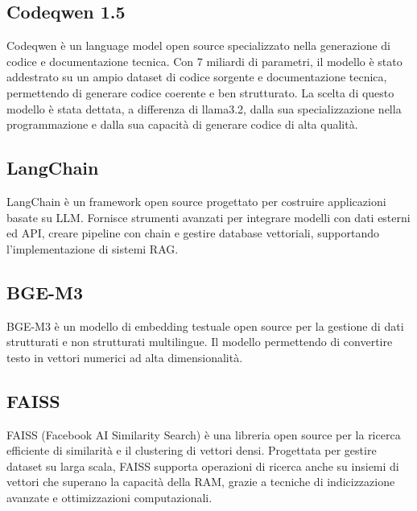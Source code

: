 \documentclass[12pt,a4paper,openright,twoside]{book}
\begin{document}
\subsection{Codeqwen 1.5}
Codeqwen \cite{codeqwen1.5} è un language model open source specializzato nella generazione di codice e documentazione tecnica.  
Con 7 miliardi di parametri, il modello è stato addestrato su un ampio dataset di codice sorgente e documentazione tecnica, permettendo di generare codice coerente e ben strutturato.
La scelta di questo modello è stata dettata, a differenza di llama3.2, dalla sua specializzazione nella programmazione e dalla sua capacità di generare codice di alta qualità. 

\subsection{LangChain}
LangChain \cite{langchain} è un framework open source progettato per costruire applicazioni basate su LLM.
Fornisce strumenti avanzati per integrare modelli con dati esterni ed API, creare pipeline con chain
e gestire database vettoriali, supportando l'implementazione di sistemi RAG.

\subsection{BGE-M3}
BGE-M3 \cite{bge-m3} è un modello di embedding testuale open source per la gestione di dati strutturati e non strutturati multilingue.
Il modello permettendo di convertire testo in vettori numerici ad alta dimensionalità.

\subsection{FAISS}
FAISS (Facebook AI Similarity Search) \cite{faiss} è una libreria open source per la ricerca efficiente di similarità e il clustering di vettori densi.
Progettata per gestire dataset su larga scala, FAISS supporta operazioni di ricerca anche su insiemi di vettori che superano la capacità della RAM, grazie a tecniche di indicizzazione avanzate e ottimizzazioni computazionali.
\end{document}
